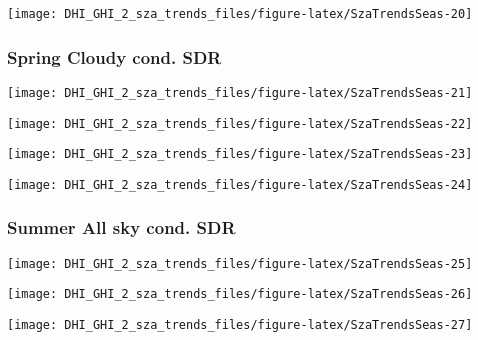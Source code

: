 \documentclass[
  10pt,
  a4paper,oneside]{article}
\begin{document}
\begin{center}\texttt{[image: DHI\_GHI\_2\_sza\_trends\_files/figure-latex/SzaTrendsSeas-20]} \end{center}

\newpage

\hypertarget{spring-cloudy-cond.-sdr}{%
\subsubsection{Spring Cloudy cond. SDR}\label{spring-cloudy-cond.-sdr}}

\begin{center}\texttt{[image: DHI\_GHI\_2\_sza\_trends\_files/figure-latex/SzaTrendsSeas-21]} \end{center}

\begin{center}\texttt{[image: DHI\_GHI\_2\_sza\_trends\_files/figure-latex/SzaTrendsSeas-22]} \end{center}

\begin{center}\texttt{[image: DHI\_GHI\_2\_sza\_trends\_files/figure-latex/SzaTrendsSeas-23]} \end{center}

\begin{center}\texttt{[image: DHI\_GHI\_2\_sza\_trends\_files/figure-latex/SzaTrendsSeas-24]} \end{center}

\newpage

\hypertarget{summer-all-sky-cond.-sdr}{%
\subsubsection{Summer All sky cond. SDR}\label{summer-all-sky-cond.-sdr}}

\begin{center}\texttt{[image: DHI\_GHI\_2\_sza\_trends\_files/figure-latex/SzaTrendsSeas-25]} \end{center}

\begin{center}\texttt{[image: DHI\_GHI\_2\_sza\_trends\_files/figure-latex/SzaTrendsSeas-26]} \end{center}

\begin{center}\texttt{[image: DHI\_GHI\_2\_sza\_trends\_files/figure-latex/SzaTrendsSeas-27]} \end{center}
\end{document}
